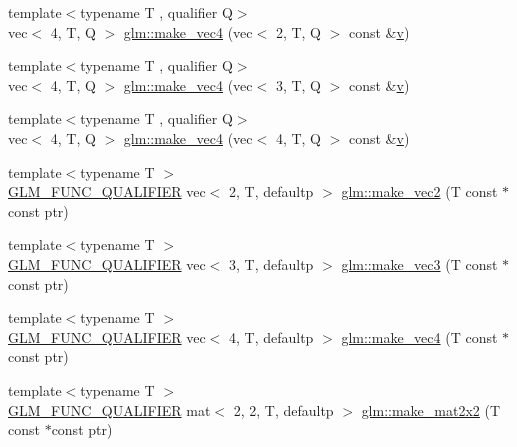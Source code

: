 \begin{DoxyCompactItemize}
\item 
{\footnotesize template$<$typename T , qualifier Q$>$ }\\vec$<$ 4, T, Q $>$ \hyperlink{group__gtc__type__ptr_gaa9bd116caf28196fd1cf00b278286fa7}{glm\+::make\+\_\+vec4} (vec$<$ 2, T, Q $>$ const \&\hyperlink{_s_d_l__opengl_8h_a10a82eabcb59d2fcd74acee063775f90}{v})
\item 
{\footnotesize template$<$typename T , qualifier Q$>$ }\\vec$<$ 4, T, Q $>$ \hyperlink{group__gtc__type__ptr_ga4036328ba4702c74cbdfad1fc03d1b8f}{glm\+::make\+\_\+vec4} (vec$<$ 3, T, Q $>$ const \&\hyperlink{_s_d_l__opengl_8h_a10a82eabcb59d2fcd74acee063775f90}{v})
\item 
{\footnotesize template$<$typename T , qualifier Q$>$ }\\vec$<$ 4, T, Q $>$ \hyperlink{group__gtc__type__ptr_gaa95cb15732f708f613e65a0578895ae5}{glm\+::make\+\_\+vec4} (vec$<$ 4, T, Q $>$ const \&\hyperlink{_s_d_l__opengl_8h_a10a82eabcb59d2fcd74acee063775f90}{v})
\item 
{\footnotesize template$<$typename T $>$ }\\\hyperlink{setup_8hpp_a33fdea6f91c5f834105f7415e2a64407}{G\+L\+M\+\_\+\+F\+U\+N\+C\+\_\+\+Q\+U\+A\+L\+I\+F\+I\+ER} vec$<$ 2, T, defaultp $>$ \hyperlink{group__gtc__type__ptr_ga81253cf7b0ebfbb1e70540c5774e6824}{glm\+::make\+\_\+vec2} (T const $\ast$const ptr)
\item 
{\footnotesize template$<$typename T $>$ }\\\hyperlink{setup_8hpp_a33fdea6f91c5f834105f7415e2a64407}{G\+L\+M\+\_\+\+F\+U\+N\+C\+\_\+\+Q\+U\+A\+L\+I\+F\+I\+ER} vec$<$ 3, T, defaultp $>$ \hyperlink{group__gtc__type__ptr_gad9e0d36ff489cb30c65ad1fa40351651}{glm\+::make\+\_\+vec3} (T const $\ast$const ptr)
\item 
{\footnotesize template$<$typename T $>$ }\\\hyperlink{setup_8hpp_a33fdea6f91c5f834105f7415e2a64407}{G\+L\+M\+\_\+\+F\+U\+N\+C\+\_\+\+Q\+U\+A\+L\+I\+F\+I\+ER} vec$<$ 4, T, defaultp $>$ \hyperlink{group__gtc__type__ptr_ga63f576518993efc22a969f18f80e29bb}{glm\+::make\+\_\+vec4} (T const $\ast$const ptr)
\item 
{\footnotesize template$<$typename T $>$ }\\\hyperlink{setup_8hpp_a33fdea6f91c5f834105f7415e2a64407}{G\+L\+M\+\_\+\+F\+U\+N\+C\+\_\+\+Q\+U\+A\+L\+I\+F\+I\+ER} mat$<$ 2, 2, T, defaultp $>$ \hyperlink{group__gtc__type__ptr_gae49e1c7bcd5abec74d1c34155031f663}{glm\+::make\+\_\+mat2x2} (T const $\ast$const ptr)

\end{DoxyCompactItemize}
